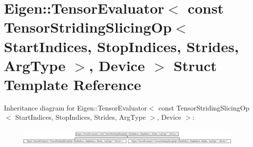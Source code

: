 \hypertarget{struct_eigen_1_1_tensor_evaluator_3_01const_01_tensor_striding_slicing_op_3_01_start_indices_00_cee1ff5835d6d215dedc4ac8d5000be4}{}\section{Eigen\+:\+:Tensor\+Evaluator$<$ const Tensor\+Striding\+Slicing\+Op$<$ Start\+Indices, Stop\+Indices, Strides, Arg\+Type $>$, Device $>$ Struct Template Reference}
\label{struct_eigen_1_1_tensor_evaluator_3_01const_01_tensor_striding_slicing_op_3_01_start_indices_00_cee1ff5835d6d215dedc4ac8d5000be4}
Inheritance diagram for Eigen\+:\+:Tensor\+Evaluator$<$ const Tensor\+Striding\+Slicing\+Op$<$ Start\+Indices, Stop\+Indices, Strides, Arg\+Type $>$, Device $>$\+:\begin{figure}[H]
\begin{center}
\leavevmode
\includegraphics[height=0.840841cm]{struct_eigen_1_1_tensor_evaluator_3_01const_01_tensor_striding_slicing_op_3_01_start_indices_00_cee1ff5835d6d215dedc4ac8d5000be4}
\end{center}
\end{figure}
